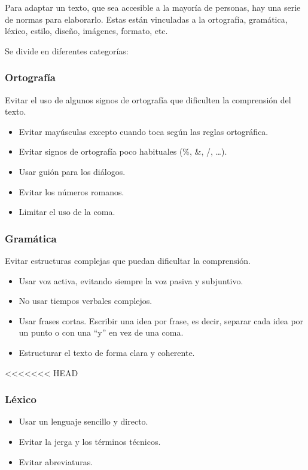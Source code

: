 Para adaptar un texto, que sea accesible a la mayoría de personas, hay una serie de normas para elaborarlo. Estas están vinculadas a la ortografía, gramática, léxico, estilo, diseño, imágenes, formato, etc. 

Se divide en diferentes categorías:
\subsubsection{Ortografía}

Evitar el uso de algunos signos de ortografía que dificulten la comprensión del texto.
	\begin{itemize}
\item	Evitar mayúsculas excepto cuando toca según las reglas ortográfica.
	
\item	Evitar signos de ortografía poco habituales (\%, \&, /, …).
\item Usar guión para los diálogos.
\item Evitar los números romanos.
	\item Limitar el uso de la coma.


 \end{itemize}
\subsubsection{Gramática}
Evitar estructuras complejas que puedan dificultar la comprensión.
\begin{itemize}
	\item Usar voz activa, evitando siempre la voz pasiva y subjuntivo.
		\item No usar tiempos verbales complejos.
			\item Usar frases cortas. Escribir una idea por frase, es decir, separar cada idea por un punto o con una ``y'' en vez de una coma. 
				\item Estructurar el texto de forma clara y coherente.
 \end{itemize}
<<<<<<< HEAD
\subsubsection{Léxico}
\begin{itemize}
	\item Usar un lenguaje sencillo y directo. 
		\item Evitar la jerga y los términos técnicos. 
			\item Evitar abreviaturas.    	
 \end{itemize}

